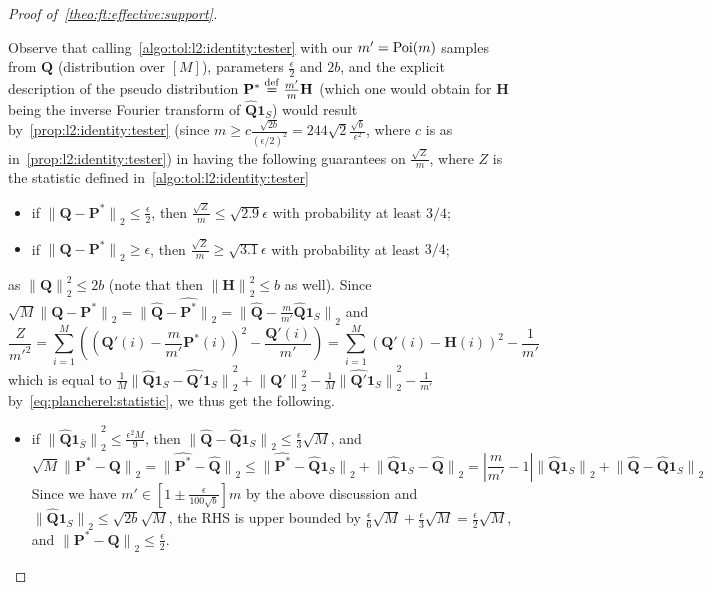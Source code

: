 \documentclass[11pt]{article}
\theoremstyle{definition}
\newcommand{\p}{\mathbf{P}}
\newcommand{\q}{\mathbf{Q}}
\newcommand{\h}{\mathbf{H}}
\newcommand{\eps}{\epsilon}
\newcommand{\abs}[1]{\lvert#1\rvert}
\newcommand{\norm}[1]{\lVert#1\rVert}
\newcommand{\Poi}{\mathop{\textnormal{Poi}}\nolimits}
\newcommand{\eqdef}{\stackrel{{\mathrm {\footnotesize def}}}{=}}
\newcommand{\normtwo}[1]{{\norm{#1}}_2}
\renewcommand{\abs}[1]{\left\lvert #1 \right\rvert}
\newcommand{\fourier}[1]{\widehat{#1}}
\begin{document}
\begin{proof}[Proof of~\cref{theo:ft:effective:support}]
\begin{itemize}
    Observe that calling~\cref{algo:tol:l2:identity:tester} with our $m'=\Poi(m)$ samples from $\q$ (distribution over $[M]$), parameters $\frac{\eps}{2}$ and $2b$, and the explicit description of the pseudo distribution $\p^\ast\eqdef \frac{m'}{m}\h$ (which one would obtain for $\h$ being the inverse Fourier transform of $\fourier{\q}\mathbf{1}_S$) would result by~\cref{prop:l2:identity:tester} (since $m \geq c\frac{\sqrt{2b}}{(\eps/2)^2} = 244\sqrt{2}\frac{\sqrt{b}}{\eps^2}$, where $c$ is as in~\cref{prop:l2:identity:tester}) in having the following guarantees on $\frac{\sqrt{Z}}{m}$, where $Z$ is the statistic defined in~\cref{algo:tol:l2:identity:tester}
    \begin{itemize}
      \item if $\normtwo{\q-\p^\ast} \leq \frac{\eps}{2}$, then $\frac{\sqrt{Z}}{m} \leq \sqrt{2.9}\eps$ with probability at least $3/4$;
      \item if $\normtwo{\q-\p^\ast} \geq \eps$, then $\frac{\sqrt{Z}}{m} \geq \sqrt{3.1}\eps$ with probability at least $3/4$;
    \end{itemize}
    as $\normtwo{\q}^2 \leq 2b$ (note that then $\normtwo{\h}^2 \leq b$ as well). Since $\sqrt{M}\normtwo{\q-\p^\ast} = \normtwo{\fourier{\q}-\fourier{\p^\ast}} = \normtwo{\fourier{\q}-\frac{m}{m'}\fourier{\q}\mathbf{1}_S}$ and     \[
      \frac{Z}{m'^2} = \sum_{i=1}^M \left( (\q'(i)-\frac{m}{m'}\p^\ast(i))^2 - \frac{\q'(i)}{m'} \right) = \sum_{i=1}^M (\q'(i)-\h(i))^2 - \frac{1}{m'}
    \]
    which is equal to $\frac{1}{M}\normtwo{\fourier{\q}\mathbf{1}_{S}-\fourier{\q'}\mathbf{1}_{S}}^2 + \normtwo{\q'}^2 - \frac{1}{M}\normtwo{\fourier{\q'}\mathbf{1}_{S}}^2 - \frac{1}{m'}$ by~\cref{eq:plancherel:statistic}, we thus get the following.
    \begin{itemize}
      \item if $\normtwo{\fourier{\q}\mathbf{1}_{\bar{S}}}^2 \leq \frac{\eps^2M}{9}$, then $\normtwo{\fourier{\q}-\fourier{\q}\mathbf{1}_{S}} \leq \frac{\eps}{3}\sqrt{M}$, and
      \[
          \sqrt{M}\normtwo{\p^\ast-\q} = \normtwo{\fourier{\p^\ast}-\fourier{\q}} \leq \normtwo{\fourier{\p^\ast}-\fourier{\q}\mathbf{1}_{S}} + \normtwo{\fourier{\q}\mathbf{1}_{S}-\fourier{\q}}
          = \abs{\frac{m}{m'}-1}\normtwo{\fourier{\q}\mathbf{1}_{S}} + \normtwo{\fourier{\q}-\fourier{\q}\mathbf{1}_{S}}
      \]
      Since we have $m'\in[1\pm\frac{\eps}{100\sqrt{b}}]m$ by the above discussion and $\normtwo{\fourier{\q}\mathbf{1}_{S}}\leq \sqrt{2b}\sqrt{M}$, the RHS is upper bounded by $\frac{\eps}{6}\sqrt{M} + \frac{\eps}{3}\sqrt{M} = \frac{\eps}{2}\sqrt{M}$, and $\normtwo{\p^\ast-\q} \leq \frac{\eps}{2}$.

\end{itemize}
\end{itemize}
\end{proof}
\end{document}
